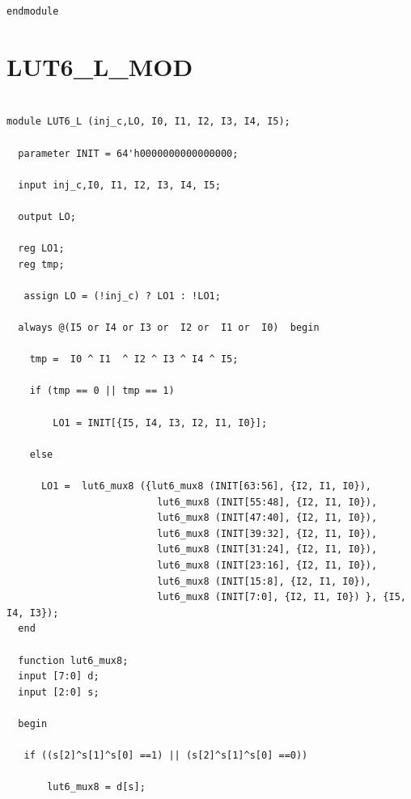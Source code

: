 \documentclass[a4paper,openright,12pt]{report}
\begin{document}
\begin{lstlisting}
endmodule

\end{lstlisting}

\section{LUT6\_L\_MOD}
\begin{lstlisting}

module LUT6_L (inj_c,LO, I0, I1, I2, I3, I4, I5);

  parameter INIT = 64'h0000000000000000;

  input inj_c,I0, I1, I2, I3, I4, I5;

  output LO;

  reg LO1;
  reg tmp;
  
   assign LO = (!inj_c) ? LO1 : !LO1;

  always @(I5 or I4 or I3 or  I2 or  I1 or  I0)  begin
 
    tmp =  I0 ^ I1  ^ I2 ^ I3 ^ I4 ^ I5;

    if (tmp == 0 || tmp == 1)

        LO1 = INIT[{I5, I4, I3, I2, I1, I0}];

    else 
    
      LO1 =  lut6_mux8 ({lut6_mux8 (INIT[63:56], {I2, I1, I0}),
                          lut6_mux8 (INIT[55:48], {I2, I1, I0}),
                          lut6_mux8 (INIT[47:40], {I2, I1, I0}),
                          lut6_mux8 (INIT[39:32], {I2, I1, I0}),
                          lut6_mux8 (INIT[31:24], {I2, I1, I0}),
                          lut6_mux8 (INIT[23:16], {I2, I1, I0}),
                          lut6_mux8 (INIT[15:8], {I2, I1, I0}),
                          lut6_mux8 (INIT[7:0], {I2, I1, I0}) }, {I5, I4, I3});
  end

  function lut6_mux8;
  input [7:0] d;
  input [2:0] s;
   
  begin

   if ((s[2]^s[1]^s[0] ==1) || (s[2]^s[1]^s[0] ==0))
           
       lut6_mux8 = d[s];


\end{lstlisting}
\end{document}

